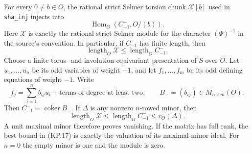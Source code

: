 \begin{theorem}
For every $0\ne b\in O$, the rational strict Selmer torsion
chunk $\mathcal X[b]$ used in \texttt{sha\_inj} injects into
\[
               \operatorname{Hom}_O(C^-_{-1},O/(b)).         \tag{KP.14}
\]
Here $\mathcal X$ is exactly the rational strict Selmer module
for the character $(\Psi)^{-1}$ in the source's convention.
In particular, if $C^-_{-1}$ has finite length, then
\[
           \operatorname{length}_O\mathcal X
                   \leq\operatorname{length}_O C^-_{-1}.    \tag{KP.15}
\]
Choose a finite torus- and involution-equivariant presentation
of $S$ over $O$.  Let $u_1,\ldots,u_n$ be its odd variables of
weight $-1$, and let $f_1,\ldots,f_m$ be its odd defining
equations of weight $-1$.  Write
\[
 f_j=\sum_{i=1}^n b_{ij}u_i+\text{terms of degree at least two},
       \qquad B_-=(b_{ij})\in M_{n\times m}(O).              \tag{KP.16}
\]
Then $C^-_{-1}=\operatorname{coker} B_-$.  If $\Delta$ is any
nonzero $n$-rowed minor, then
\[
       \operatorname{length}_O\mathcal X
                  \leq\operatorname{length}_O C^-_{-1}
                  \leq v_O(\Delta).                         \tag{KP.17}
\]
A unit maximal minor therefore proves vanishing.  If the
matrix has full rank, the best bound in (KP.17) is exactly
the valuation of its maximal-minor ideal.  For $n=0$ the
empty minor is one and the module is zero.
\end{theorem}
